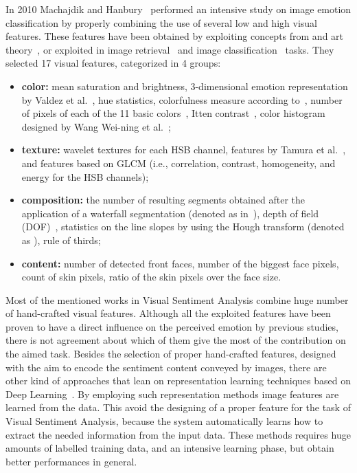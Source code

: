 In 2010 Machajdik and Hanbury~\cite{machajdik2010affective} performed an intensive study on image emotion classification by properly combining the use of several low and high visual features. These features have been obtained by exploiting concepts from and art theory~\cite{itten1973art, valdez1994effects}, or exploited in image retrieval~\cite{stottinger2009translating} and image classification~\cite{datta2006studying, wei2006image} tasks.
They selected 17 visual features, categorized in 4 groups:
\begin{itemize}
	\item \textbf{color:} mean saturation and brightness, 3-dimensional emotion representation by Valdez et al.~\cite{valdez1994effects}, hue statistics, colorfulness measure according to~\cite{datta2006studying}, number of pixels of each of the 11 basic colors~\cite{van2007learning}, Itten contrast~\cite{itten1973art}, color histogram designed by Wang Wei-ning et al.~\cite{wei2006image};
	
	\item \textbf{texture:} wavelet textures for each HSB channel, features by Tamura et al.~\cite{tamura1978textural}, and features based on GLCM (i.e., correlation, contrast, homogeneity, and energy for the HSB channels);
	
	\item \textbf{composition:} the number of resulting segments obtained after the application of a waterfall segmentation (denoted as  in~\cite{machajdik2010affective}), depth of field (DOF)~\cite{datta2006studying}, statistics on the line slopes by using the Hough transform (denoted as ), rule of thirds;
	
	\item \textbf{content:} number of detected front faces, number of the biggest face pixels, count of skin pixels, ratio of the skin pixels over the face size.
	
\end{itemize}

Most of the mentioned works in Visual Sentiment Analysis combine huge number of hand-crafted visual features. Although all the exploited features have been proven to have a direct influence on the perceived emotion by previous studies, there is not agreement about which of them give the most of the contribution on the aimed task.
Besides the selection of proper hand-crafted features, designed with the aim to encode the sentiment content conveyed by images, there are other kind of approaches that lean on representation learning techniques based on Deep Learning~\cite{chen2014deepsentibank, xu2014visual, you2015robust}. By employing such representation methods image features are learned from the data. This avoid the designing of a proper feature for the task of Visual Sentiment Analysis, because the system automatically learns how to extract the needed information from the input data. These methods requires huge amounts of labelled training data, and an intensive learning phase, but obtain better performances in general.

